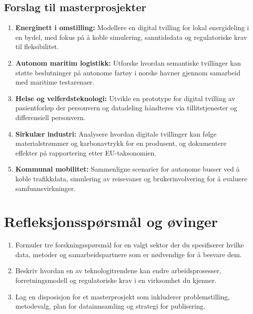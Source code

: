 \subsection{Forslag til masterprosjekter}
\begin{enumerate}
    \item \textbf{Energinett i omstilling:} Modellere en digital tvilling for lokal energideling i en bydel, med fokus på å koble simulering, sanntidsdata og regulatoriske krav til fleksibilitet.
    \item \textbf{Autonom maritim logistikk:} Utforske hvordan semantiske tvillinger kan støtte beslutninger på autonome fartøy i norske havner gjennom samarbeid med maritime testarenaer.
    \item \textbf{Helse og velferdsteknologi:} Utvikle en prototype for digital tvilling av pasientforløp der personvern og datadeling håndteres via tillitstjenester og differensiell personvern.
    \item \textbf{Sirkulær industri:} Analysere hvordan digitale tvillinger kan følge materialstrømmer og karbonavtrykk for en produsent, og dokumentere effekter på rapportering etter EU-taksonomien.
    \item \textbf{Kommunal mobilitet:} Sammenligne scenarier for autonome busser ved å koble trafikkdata, simulering av reisevaner og brukerinvolvering for å evaluere samfunnsvirkninger.
\end{enumerate}

\section{Refleksjonsspørsmål og øvinger}
\begin{enumerate}
    \item Formuler tre forskningsspørsmål for en valgt sektor der du spesifiserer hvilke data, metoder og samarbeidspartnere som er nødvendige for å besvare dem.
    \item Beskriv hvordan en av teknologitrendene kan endre arbeidsprosesser, forretningsmodell og regulatoriske krav i en virksomhet du kjenner.
    \item Lag en disposisjon for et masterprosjekt som inkluderer problemstilling, metodevalg, plan for datainnsamling og strategi for publisering.
\end{enumerate}
